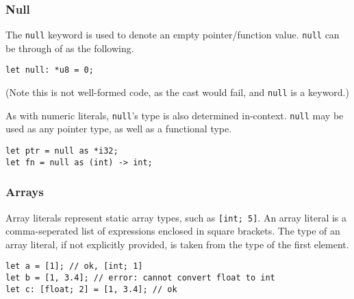 \subsubsection{Null}

The \texttt{null} keyword is used to denote an empty pointer/function value.
\texttt{null} can be through of as the following.

\begin{lstlisting}[language=CustomLang]
let null: *u8 = 0;
\end{lstlisting}

(Note this is not well-formed code, as the cast would fail, and \texttt{null} is a keyword.)

As with numeric literals, \texttt{null}'s type is also determined in-context.
\texttt{null} may be used as any pointer type, as well as a functional type.

\begin{lstlisting}[language=CustomLang]
let ptr = null as *i32;
let fn = null as (int) -> int;
\end{lstlisting}

\subsubsection{Arrays}

Array literals represent static array types, such as \texttt{[int; 5]}.
An array literal is a comma-seperated list of expressions enclosed in square brackets.
The type of an array literal, if not explicitly provided, is taken from the type of the first element.

\begin{lstlisting}[language=CustomLang]
let a = [1]; // ok, [int; 1]
let b = [1, 3.4]; // error: cannot convert float to int
let c: [float; 2] = [1, 3.4]; // ok
\end{lstlisting}
